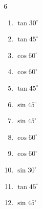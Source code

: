 \begin{multicols}{6}
\begin{enumerate}

  \item $\displaystyle \tan{30^\circ}$


  \item $\displaystyle \tan{45^\circ}$

        \phantom{$\displaystyle =1$}

  \item $\displaystyle \cos{60^\circ}$


  \item $\displaystyle \cos{60^\circ}$


\columnbreak %

  \item $\displaystyle \tan{45^\circ}$

        \phantom{$\displaystyle =1$}

  \item $\displaystyle \sin{45^\circ}$


  \item $\displaystyle \sin{45^\circ}$


  \item $\displaystyle \cos{60^\circ}$


  \item $\displaystyle \cos{60^\circ}$


  \item $\displaystyle \sin{30^\circ}$


  \item $\displaystyle \tan{45^\circ}$

        \phantom{$\displaystyle =1$}

  \item $\displaystyle \sin{45^\circ}$



\end{enumerate}
\end{multicols}
